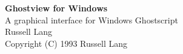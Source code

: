 %
%
\setlength{\textwidth}{160mm}
\setlength{\oddsidemargin}{5mm}
\setlength{\topmargin}{-12mm}
\setlength{\textheight}{240mm}
\setlength{\parskip}{1ex}
\setlength{\parindent}{0pt}


\pagestyle{empty}
   \rule{0in}{3in}
   \begin{center}
   {\huge\bf Ghostview for Windows}\\
   \vspace{3ex}
   {\Large A graphical interface for Windows Ghostscript}\\
   \vspace{2ex}
   \large
   Russell Lang\\
   \vspace{2ex}
   Copyright (C) 1993   Russell Lang\\
   \end{center}
\newpage

\tableofcontents
\newpage

\setcounter{page}{1}
\pagestyle{myheadings}

